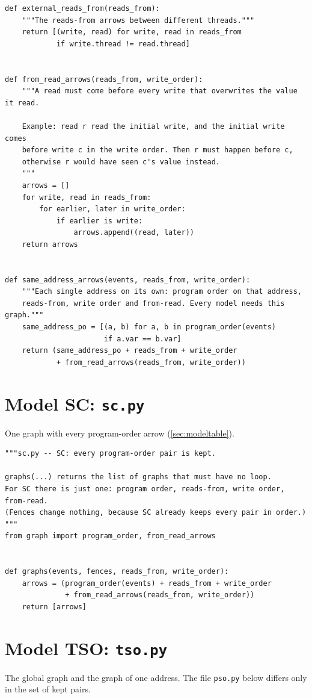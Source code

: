 \begin{lstlisting}[style=vspython]
def external_reads_from(reads_from):
    """The reads-from arrows between different threads."""
    return [(write, read) for write, read in reads_from
            if write.thread != read.thread]


def from_read_arrows(reads_from, write_order):
    """A read must come before every write that overwrites the value it read.

    Example: read r read the initial write, and the initial write comes
    before write c in the write order. Then r must happen before c,
    otherwise r would have seen c's value instead.
    """
    arrows = []
    for write, read in reads_from:
        for earlier, later in write_order:
            if earlier is write:
                arrows.append((read, later))
    return arrows


def same_address_arrows(events, reads_from, write_order):
    """Each single address on its own: program order on that address,
    reads-from, write order and from-read. Every model needs this graph."""
    same_address_po = [(a, b) for a, b in program_order(events)
                       if a.var == b.var]
    return (same_address_po + reads_from + write_order
            + from_read_arrows(reads_from, write_order))
\end{lstlisting}

\section{Model SC: \texttt{sc.py}}
One graph with every program-order arrow (\cref{sec:modeltable}).

\begin{lstlisting}[style=vspython]
"""sc.py -- SC: every program-order pair is kept.

graphs(...) returns the list of graphs that must have no loop.
For SC there is just one: program order, reads-from, write order, from-read.
(Fences change nothing, because SC already keeps every pair in order.)
"""
from graph import program_order, from_read_arrows


def graphs(events, fences, reads_from, write_order):
    arrows = (program_order(events) + reads_from + write_order
              + from_read_arrows(reads_from, write_order))
    return [arrows]
\end{lstlisting}

\section{Model TSO: \texttt{tso.py}}
The global graph and the graph of one address. The file \texttt{pso.py} below differs only in the set of kept pairs.

